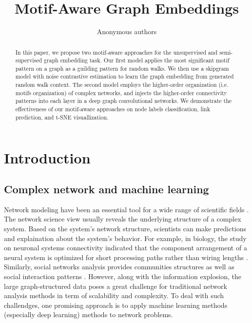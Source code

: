 \documentclass{article}
\title{Motif-Aware Graph Embeddings}
\author{Anonymous authors}
\theoremstyle{definition}
\begin{document}
\maketitle

\begin{abstract}
  In this paper, we propose two motif-aware approaches for the unsupervised 
  and semi-supervised graph embedding task. Our first model applies the most
  significant motif pattern on a graph as a guilding pattern for random walks.
  We then use a skipgram model with noise contrastive estimation to learn the
  graph embedding from generated random walk context. The second model employs the 
  higher-order organization (i.e. motifs organization) of complex networks, 
  and injects the higher-order connectivity patterns into each layer in a deep 
  graph convolutional networks. We demonstrate the effectiveness of our 
  motif-aware approaches on node labels classification, link prediction, and t-SNE 
  visuallization.
\end{abstract}

\section{Introduction}

\subsection{Complex network and machine learning}

Network modeling have been an essential tool for a wide
range of scientific fields \cite{physicnet,molecule,youtube,motifblockmilo,juremotif}.
The network science view usually reveals the underlying structure 
of a complex system. Based on the system's network structure, 
scientists can make predictions and explaination
about the system's behavior. For example, in biology, the
study on neuronal systems connectivity indicated
that the component arrangement of a neural system is optimized
for short processing paths rather than wiring lengths \cite{kaiser2006nonoptimal}. 
Similarly, social networks analysis provides communities structures
as well as social interaction patterns \cite{west2014exploiting,barabasi2014network}. 
However, along with the information explosion, the large graph-structured
data poses a great challenge for traditional network analysis methods
in term of scalability and complexity. To deal with such challendges,
one promising approach is to apply machine learning methods (especially
deep learning) methods to network problems.
\end{document}
